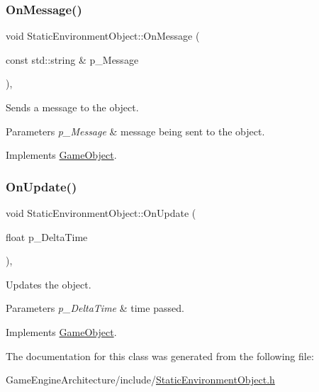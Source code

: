 \subsubsection{\texorpdfstring{OnMessage()}{OnMessage()}}
{\footnotesize\ttfamily void Static\+Environment\+Object\+::\+On\+Message (\begin{DoxyParamCaption}\item[{const std\+::string \&}]{p\+\_\+\+Message }\end{DoxyParamCaption})\hspace{0.3cm}{\ttfamily [override]}, {\ttfamily [virtual]}}



Sends a message to the object. 


\begin{DoxyParams}{Parameters}
{\em p\+\_\+\+Message} & message being sent to the object. \\
\hline
\end{DoxyParams}


Implements \mbox{\hyperlink{class_game_object_a162f15f809f5181e3264b9f4d768bea2}{Game\+Object}}.

\mbox{\label{class_static_environment_object_accbe302e081137786ee1958d657f0271}} 
\subsubsection{\texorpdfstring{OnUpdate()}{OnUpdate()}}
{\footnotesize\ttfamily void Static\+Environment\+Object\+::\+On\+Update (\begin{DoxyParamCaption}\item[{float}]{p\+\_\+\+Delta\+Time }\end{DoxyParamCaption})\hspace{0.3cm}{\ttfamily [override]}, {\ttfamily [virtual]}}



Updates the object. 


\begin{DoxyParams}{Parameters}
{\em p\+\_\+\+Delta\+Time} & time passed. \\
\hline
\end{DoxyParams}


Implements \mbox{\hyperlink{class_game_object_a3d4444ab3efd5e3041014da90a66c081}{Game\+Object}}.



The documentation for this class was generated from the following file\+:\begin{DoxyCompactItemize}
\item 
Game\+Engine\+Architecture/include/\mbox{\hyperlink{_static_environment_object_8h}{Static\+Environment\+Object.\+h}}\end{DoxyCompactItemize}
